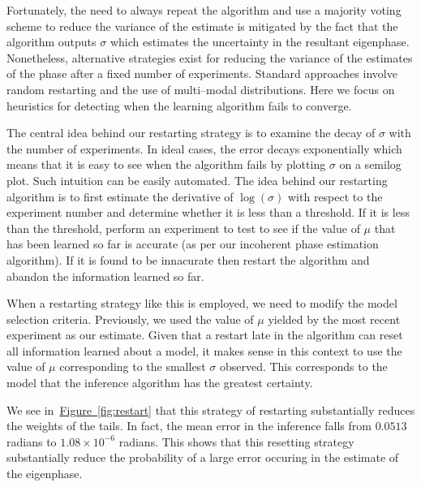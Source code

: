 \documentclass[aps,pra,amsmath,twocolumn,amssymb,superscriptaddress]{revtex4-1}
\newcommand{\fig}[1]{\hyperref[fig:#1]{Figure~\ref*{fig:#1}}}
\begin{document}
Fortunately, the need to always repeat the algorithm and use a majority voting scheme to reduce the variance of the estimate is mitigated by the fact that the algorithm outputs $\sigma$ which estimates the uncertainty in the resultant eigenphase.  
Nonetheless, alternative strategies exist for reducing the variance of the estimates of the phase after a fixed number of experiments.  Standard approaches involve random restarting and the use of multi--modal distributions.  Here we focus on heuristics for detecting when the learning algorithm fails to converge.

The central idea behind our restarting strategy is to examine the decay of $\sigma$ with the number of experiments.  In ideal cases, the error decays exponentially which means that it is easy to see when the algorithm fails by plotting $\sigma$ on a semilog plot.  Such intuition can be easily automated.  The idea behind our restarting algorithm is to first estimate the derivative of $\log(\sigma)$ with respect to the experiment number and determine whether it is less than a threshold.  If it is less than the threshold, perform an experiment to test to see if the value of $\mu$ that has been learned so far is accurate (as per our incoherent phase estimation algorithm).  If it is found to be innacurate then restart the algorithm and abandon the information learned so far.

When a restarting strategy like this is employed, we need to modify the model selection criteria.  Previously, we used the value of $\mu$ yielded by the most recent experiment as our estimate.   Given that a restart late in the algorithm can reset all information learned about a model, it makes sense in this context to use the value of $\mu$ corresponding to the smallest $\sigma$ observed.  This corresponds to the model that the inference algorithm has the greatest certainty.

We see in~\fig{restart} that this strategy of restarting substantially reduces the weights of the tails.  In fact, the mean error in the inference falls from $0.0513$ radians to $1.08\times 10^{-6}$ radians.  This shows that this resetting strategy substantially reduce the probability of a large error occuring in the estimate of the eigenphase.
\end{document}

